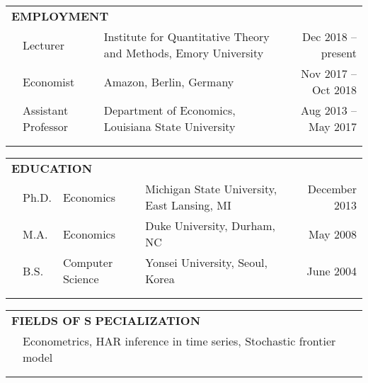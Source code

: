 \documentclass[10pt]{article}
\begin{document}
\begin{center}
\bigskip \bigskip
\begin{tabular}{llllr}
\multicolumn{5}{l}{{\Large \textbf{E}}\textbf{MPLOYMENT}} \vspace{0.1cm}\\
&\multicolumn{1}{l}{Lecturer} & \multicolumn{2}{l}{Institute for Quantitative Theory and Methods, Emory University}& \multicolumn{1}{r}{Dec 2018 -- present}\vspace{0.1cm} \\
&\multicolumn{1}{l}{Economist} & \multicolumn{2}{l}{Amazon, Berlin, Germany}& \multicolumn{1}{r}{Nov 2017 -- Oct 2018}\vspace{0.1cm} \\
&\multicolumn{1}{l}{Assistant Professor} &\multicolumn{2}{l}{Department of Economics, Louisiana State University}& \multicolumn{1}{r}{Aug 2013 -- May 2017} \\
\multicolumn{5}{p{500pt}}{}\\\\
\end{tabular}
\begin{tabular}{llllr}
\multicolumn{5}{l}{{\Large \textbf{E}}\textbf{DUCATION}} \vspace{0.1cm}\\
&\multicolumn{1}{l}{Ph.D.} & \multicolumn{1}{l}{Economics}&\multicolumn{1}{l}{Michigan State University, East Lansing, MI}& \multicolumn{1}{r}{December 2013} \\
&\multicolumn{1}{l}{M.A.} & \multicolumn{1}{l}{Economics}& \multicolumn{1}{l}{Duke University, Durham, NC} & \multicolumn{1}{r}{May 2008} \\
&\multicolumn{1}{l}{B.S.} & \multicolumn{1}{l}{Computer Science}& \multicolumn{1}{l}{Yonsei University, Seoul, Korea} & \multicolumn{1}{r}{June 2004} \\
\multicolumn{5}{p{500pt}}{}\\\\
\end{tabular}
\begin{tabular}{llllr}
\multicolumn{5}{l}{{\Large \textbf{F}}\textbf{IELDS OF} {\Large \textbf{S}}%
\textbf{PECIALIZATION}} \vspace{0.1cm}\\
& \multicolumn{4}{l}{Econometrics, HAR inference in time series, Stochastic frontier model} \\
\multicolumn{5}{p{500pt}}{}\\\\
\end{tabular}
\begin{tabular}{llllr}

\end{tabular}
\end{center}
\end{document}
